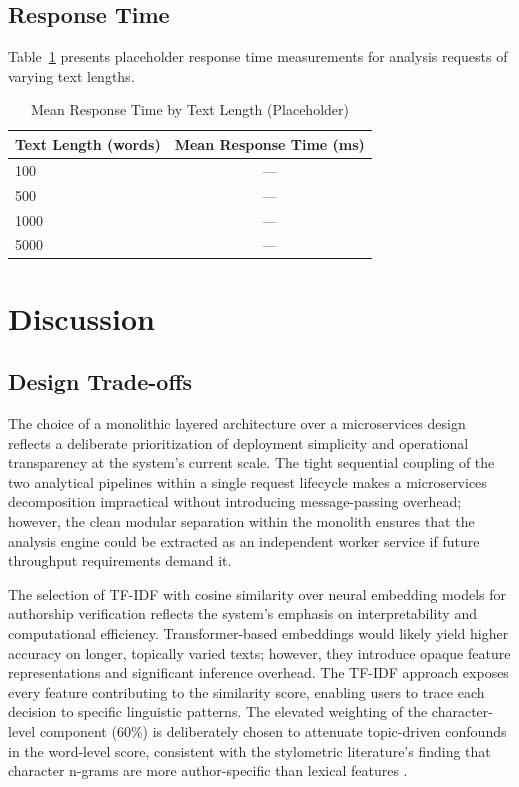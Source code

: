 \documentclass[conference]{IEEEtran}
\begin{document}
\subsection{Response Time}

Table~\ref{tab:perf} presents placeholder response time measurements for
analysis requests of varying text lengths.

\begin{table}[htbp]
\caption{Mean Response Time by Text Length (Placeholder)}
\begin{center}
\begin{tabular}{lc}
\toprule
\textbf{Text Length (words)} & \textbf{Mean Response Time (ms)} \\
\midrule
100   & --- \\
500   & --- \\
1000  & --- \\
5000  & --- \\
\bottomrule
\end{tabular}
\end{center}
\label{tab:perf}
\end{table}

\section{Discussion}
\label{sec:discussion}

\subsection{Design Trade-offs}

The choice of a monolithic layered architecture over a microservices design
reflects a deliberate prioritization of deployment simplicity and operational
transparency at the system's current scale. The tight sequential coupling of
the two analytical pipelines within a single request lifecycle makes a
microservices decomposition impractical without introducing message-passing
overhead; however, the clean modular separation within the monolith ensures
that the analysis engine could be extracted as an independent worker service
if future throughput requirements demand it.

The selection of TF-IDF with cosine similarity over neural embedding models
for authorship verification reflects the system's emphasis on interpretability
and computational efficiency. Transformer-based embeddings \cite{vaswani2017attention}
would likely yield higher accuracy on longer, topically varied texts; however,
they introduce opaque feature representations and significant inference
overhead. The TF-IDF approach exposes every feature contributing to the
similarity score, enabling users to trace each decision to specific linguistic
patterns. The elevated weighting of the character-level component (60\%) is
deliberately chosen to attenuate topic-driven confounds in the word-level
score, consistent with the stylometric literature's finding that character
n-grams are more author-specific than lexical features \cite{stamatatos2009survey}.
\end{document}
